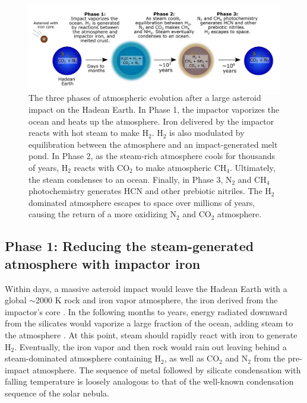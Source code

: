 \begin{figure}
  \centering
  \includegraphics[width=1.0\textwidth]{tex/5impacts/figures/impact_diagram.pdf}
  \caption{The three phases of atmospheric evolution after a large asteroid impact on the Hadean Earth. In Phase 1, the impactor vaporizes the ocean and heats up the atmosphere. Iron delivered by the impactor reacts with hot steam to make H$_2$. H$_2$ is also modulated by equilibration between the atmosphere and an impact-generated melt pond. In Phase 2, as the steam-rich atmosphere cools for thousands of years, H$_2$ reacts with CO$_2$ to make atmospheric CH$_4$. Ultimately, the steam condenses to an ocean. Finally, in Phase 3, N$_2$ and CH$_4$ photochemistry generates HCN and other prebiotic nitriles. The H$_2$ dominated atmosphere escapes to space over millions of years, causing the return of a more oxidizing N$_2$ and CO$_2$ atmosphere.}
  \label{fig:impact_diagram}
\end{figure}

\subsection{Phase 1: Reducing the steam-generated atmosphere with impactor iron} \label{sec:phase1}

Within days, a massive asteroid impact would leave the Hadean Earth with a global $\sim$2000 K rock and iron vapor atmosphere, the iron derived from the impactor's core \citep{Itcovitz_2022}. In the following months to years, energy radiated downward from the silicates would vaporize a large fraction of the ocean, adding steam to the atmosphere \citep{Sleep_1989}. At this point, steam should rapidly react with iron to generate H$_2$. Eventually, the iron vapor and then rock would rain out leaving behind a steam-dominated atmosphere containing H$_2$, as well as CO$_2$ and N$_2$ from the pre-impact atmosphere. The sequence of metal followed by silicate condensation with falling temperature is loosely analogous to that of the well-known condensation sequence of the solar nebula.

